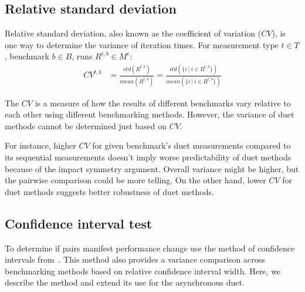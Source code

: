 \subsection{Relative standard deviation}
\label{sec:cv}

Relative standard deviation, also known as the coefficient of variation ($CV$), is one way to determine the variance of iteration times.
For measurement type $t \in T$, benchmark $b \in B$, runs $R^{t, b} \in M^e$:
\begin{align*}
CV^{t, b} &= \frac{std(R^{t, b})}{mean(R^{t, b})} = \frac{std(\{i~|~i \in R^{t, b}\})}{mean(\{i~|~i \in R^{t, b}\})}
\end{align*}

The $CV$ is a measure of how the results of different benchmarks vary relative to each other using different benchmarking methods.
However, the variance of duet methods cannot be determined just based on $CV$.

For instance, higher $CV$ for given benchmark's duet measurements compared to its sequential measurements doesn't imply worse predictability of duet methods because of the impact symmetry argument.
Overall variance might be higher, but the pairwise comparison could be more telling.
On the other hand, lower $CV$ for duet methods suggests better robustness of duet methods.

\subsection{Confidence interval test}
\label{sec:ci_test}

To determine if pairs manifest performance change use the method of confidence intervals from~\citet{bulej2020duet}.
This method also provides a variance comparison across benchmarking methods based on relative confidence interval width.
Here, we describe the method and extend its use for the asynchronous duet.

